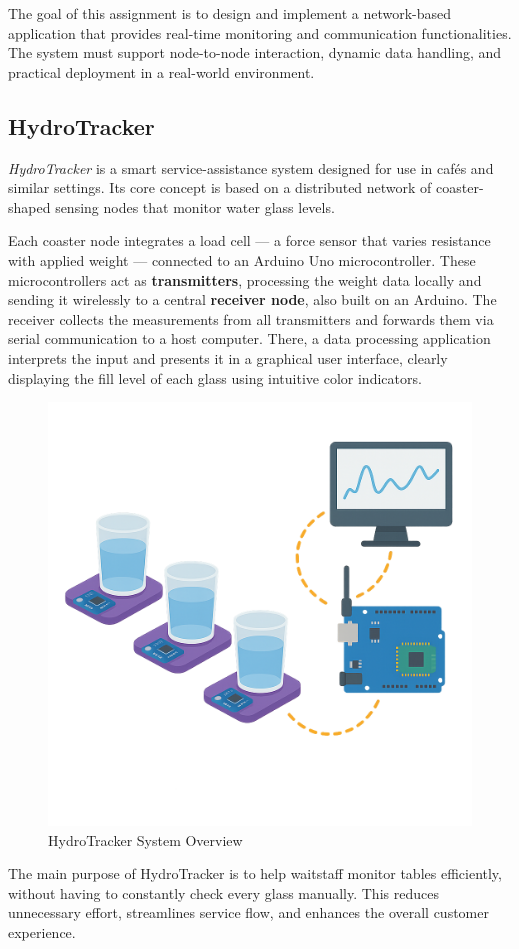 The goal of this assignment is to design and implement a network-based application that provides real-time monitoring and communication functionalities. The system must support node-to-node interaction, dynamic data handling, and practical deployment in a real-world environment.

\subsection{HydroTracker}

\textit{HydroTracker} is a smart service-assistance system designed for use in cafés and similar settings. Its core concept is based on a distributed network of coaster-shaped sensing nodes that monitor water glass levels.

Each coaster node integrates a load cell — a force sensor that varies resistance with applied weight — connected to an Arduino Uno microcontroller. These microcontrollers act as \textbf{transmitters}, processing the weight data locally and sending it wirelessly to a central \textbf{receiver node}, also built on an Arduino. The receiver collects the measurements from all transmitters and forwards them via serial communication to a host computer. There, a data processing application interprets the input and presents it in a graphical user interface, clearly displaying the fill level of each glass using intuitive color indicators.

\begin{figure}[H]
    \centering
    \includegraphics[width=0.5\linewidth]{gui_images/system overview.png}
  \caption{HydroTracker System Overview}
  \label{fig:hydrotracker_architecture}
\end{figure}

The main purpose of HydroTracker is to help waitstaff monitor tables efficiently, without having to constantly check every glass manually. This reduces unnecessary effort, streamlines service flow, and enhances the overall customer experience.

